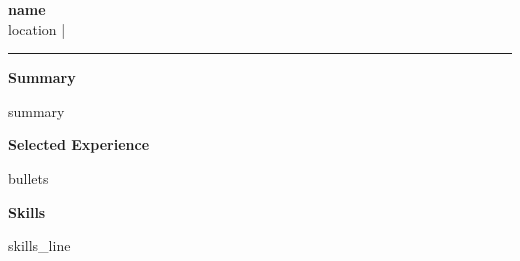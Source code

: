 \documentclass[11pt]{article}
\begin{document}
{\LARGE \textbf{{{name}}}}\\
{\small {{location}} \quad | }

\vspace{0.4em}
\hrule
\vspace{0.6em}

\textbf{Summary}

{{summary}}

\vspace{0.5em}
\textbf{Selected Experience}
\begin{itemize}
{{bullets}}
\end{itemize}

\vspace{0.5em}
\textbf{Skills}

{{skills_line}}
\end{document}
